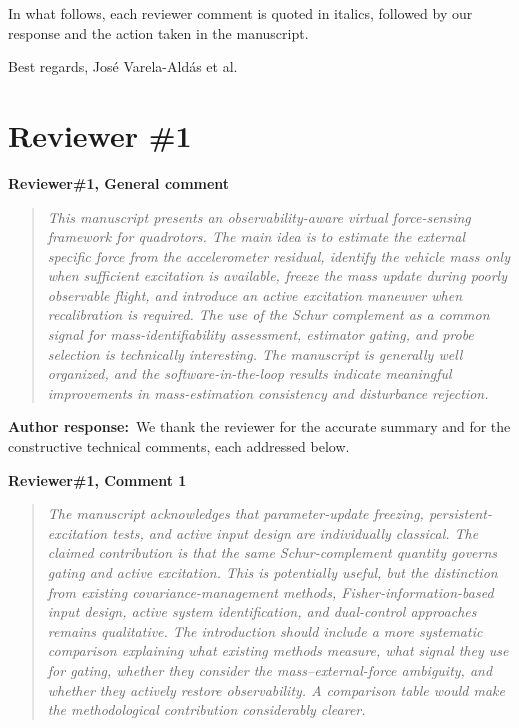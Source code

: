 \documentclass[11pt]{article}
\newcommand{\concern}[1]{\par\medskip\noindent\colorbox{gray!12}{\parbox{\dimexpr\linewidth-2\fboxsep}{\textbf{#1}}}\par\smallskip}
\newcommand{\rlabel}[1]{\par\textbf{#1}\ }
\begin{document}
In what follows, each reviewer comment is quoted in italics, followed by our response and the action taken in the manuscript.

Best regards,
Jos\'e Varela-Ald\'as et al.

\section*{Reviewer \#1}

\concern{Reviewer\#1, General comment}

\begin{quote}\itshape This manuscript presents an observability-aware virtual force-sensing framework for quadrotors. The main idea is to estimate the external specific force from the accelerometer residual, identify the vehicle mass only when sufficient excitation is available, freeze the mass update during poorly observable flight, and introduce an active excitation maneuver when recalibration is required. The use of the Schur complement as a common signal for mass-identifiability assessment, estimator gating, and probe selection is technically interesting. The manuscript is generally well organized, and the software-in-the-loop results indicate meaningful improvements in mass-estimation consistency and disturbance rejection.\end{quote}

\rlabel{Author response:}We thank the reviewer for the accurate summary and for the constructive technical comments, each addressed below.

\concern{Reviewer\#1, Comment 1}

\begin{quote}\itshape The manuscript acknowledges that parameter-update freezing, persistent-excitation tests, and active input design are individually classical. The claimed contribution is that the same Schur-complement quantity governs gating and active excitation. This is potentially useful, but the distinction from existing covariance-management methods, Fisher-information-based input design, active system identification, and dual-control approaches remains qualitative. The introduction should include a more systematic comparison explaining what existing methods measure, what signal they use for gating, whether they consider the mass--external-force ambiguity, and whether they actively restore observability. A comparison table would make the methodological contribution considerably clearer.\end{quote}
\end{document}
